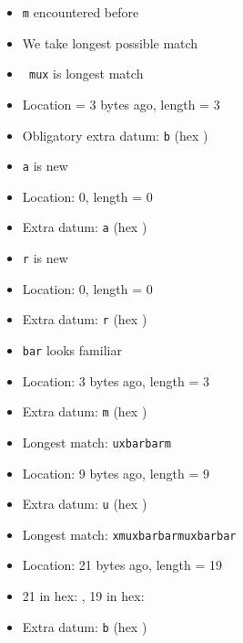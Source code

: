 \begin{frame}
\begin{overprint}
    \begin{itemize}
      \item {\tt m} encountered before
      \item We take longest possible match
      \item {\tt\color{green} mux} is longest match
      \item Location = 3 bytes ago, length = 3
      \item Obligatory extra datum: {\tt b} (hex )
    \end{itemize}

    \begin{itemize}
      \item {\tt a} is new
      \item Location: 0, length = 0
      \item Extra datum: {\tt a} (hex )
    \end{itemize}

    \begin{itemize}
      \item {\tt r} is new
      \item Location: 0, length = 0
      \item Extra datum: {\tt r} (hex )
    \end{itemize}

    \begin{itemize}
      \item {\tt bar} looks familiar
      \item Location: 3 bytes ago, length = 3
      \item Extra datum: {\tt m} (hex )
    \end{itemize}

    \begin{itemize}
      \item Longest match: {\tt uxbarbarm}
      \item Location: 9 bytes ago, length = 9
      \item Extra datum: {\tt u} (hex )
    \end{itemize}

    \begin{itemize}
      \item Longest match: {\tt xmuxbarbarmuxbarbar}
      \item Location: 21 bytes ago, length = 19
      \item 21 in hex: , 19 in hex: 
      \item Extra datum: {\tt b} (hex )
    \end{itemize}


\end{overprint}
\end{frame}
